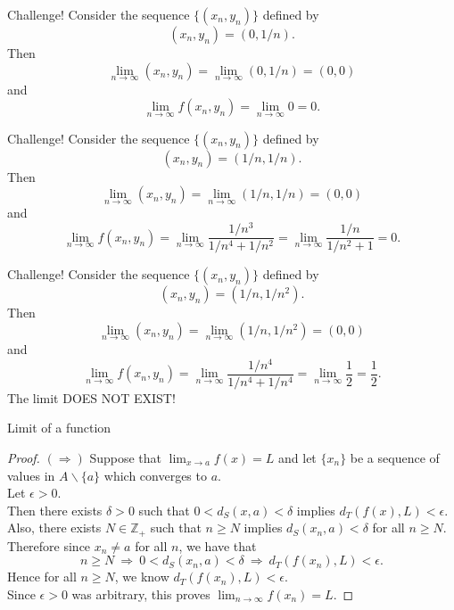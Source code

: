 \documentclass{beamer}
\begin{document}
\begin{frame}{Challenge!}
Consider the sequence $\{(x_n,y_n)\}$ defined by
$$(x_n,y_n) = (0,1/n).$$
\pause
Then
$$\lim_{n\rightarrow \infty} (x_n,y_n) = \lim_{n\rightarrow \infty} (0,1/n) = (0,0)$$
\pause
and
$$\lim_{n\rightarrow \infty} f(x_n,y_n) = \lim_{n\rightarrow \infty} 0 = 0.$$
\end{frame}

\begin{frame}{Challenge!}
Consider the sequence $\{(x_n,y_n)\}$ defined by
$$(x_n,y_n) = (1/n,1/n).$$
\pause
Then
$$\lim_{n\rightarrow \infty} (x_n,y_n) = \lim_{n\rightarrow \infty} (1/n,1/n) = (0,0)$$
\pause
and
$$\lim_{n\rightarrow \infty} f(x_n,y_n) = \lim_{n\rightarrow \infty} \frac{1/n^3}{1/n^4+1/n^2} = \lim_{n\rightarrow \infty} \frac{1/n}{1/n^2+1} = 0.$$
\end{frame}

\begin{frame}{Challenge!}
Consider the sequence $\{(x_n,y_n)\}$ defined by
$$(x_n,y_n) = (1/n,1/n^2).$$
\pause
Then
$$\lim_{n\rightarrow \infty} (x_n,y_n) = \lim_{n\rightarrow \infty} (1/n,1/n^2) = (0,0)$$
\pause
and
$$\lim_{n\rightarrow \infty} f(x_n,y_n) = \lim_{n\rightarrow \infty} \frac{1/n^4}{1/n^4+1/n^4} = \lim_{n\rightarrow \infty} \frac{1}{2} = \frac{1}{2}.$$
\pause
{\color{red}The limit DOES NOT EXIST!}
\end{frame}


\begin{frame}{Limit of a function}
\begin{proof}
$(\Rightarrow)$\quad
Suppose that $\lim_{x\rightarrow a} f(x) =L$ and let $\{x_n\}$ be a sequence of values in $A\backslash\{a\}$ which converges to $a$.\\
\pause
Let $\epsilon > 0$.\\
\pause
Then there exists $\delta > 0$ such that $0 < d_S(x,a) < \delta$ implies $d_T(f(x),L) < \epsilon$.\\
\pause
Also, there exists $N \in\mathbb{Z}_+$ such that $n\geq N$ implies $d_S(x_n,a) < \delta$ for all $n\geq N$.\\
\pause
Therefore since $x_n\neq a$ for all $n$, we have that
$$n\geq N\ \Rightarrow\ 0 < d_S(x_n,a) < \delta\ \Rightarrow\ d_T(f(x_n), L) < \epsilon.$$
\pause
Hence for all $n\geq N$, we know $d_T(f(x_n), L) < \epsilon$.\\
\pause
Since $\epsilon > 0$ was arbitrary, this proves $\lim_{n\rightarrow \infty} f(x_n) = L$.
\end{proof}
\end{frame}
\end{document}
